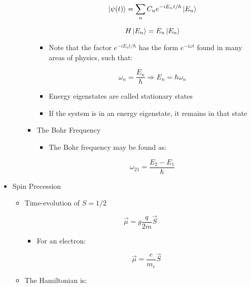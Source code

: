 \begin{itemize}
\begin{itemize}
\begin{itemize}
\begin{itemize}
                $$\ket{\psi(t)}=\sum_n C_ne^{-iE_nt/\hbar}\ket{E_n}$$

                $$H\ket{E_n}=E_n\ket{E_n}$$

              \item Note that the factor $e^{-iE_nt/\hbar}$ has the form $e^{-i\omega t}$ found in many areas of physics, such that:

                $$\omega_n=\frac{E_n}{\hbar}\Rightarrow E_n=\hbar \omega_n$$

              \item Energy eigenstates are called stationary states

              \item If the system is in an energy eigenstate, it remains in that state

            \end{itemize}

          \item The Bohr Frequency

            \begin{itemize}

              \item The Bohr frequency may be found as:

                $$\omega_{21}=\frac{E_2-E_1}{\hbar}$$

            \end{itemize}

        \end{itemize}

    \end{itemize}

  \item Spin Precession

    \begin{itemize}

      \item Time-evolution of $S=1/2$

        $$\vec{\mu}=g\frac{q}{2m}\vec{S}$$

        \begin{itemize}

          \item For an electron:

            $$\vec{\mu}=\frac{e}{m_e}\vec{S}$$

        \end{itemize}

      \item The Hamiltonian is:


\end{itemize}
\end{itemize}
